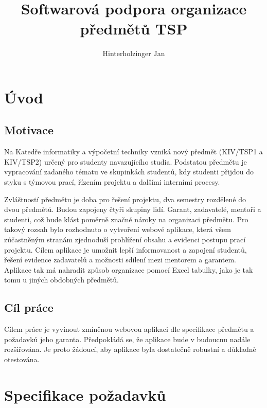 \documentclass[czech,BP]{thesiskiv}
\author{Hinterholzinger Jan}
\title{Softwarová podpora organizace předmětů TSP}
\begin{document}
%
\maketitle
\tableofcontents
\chapter{Úvod}
\section{Motivace}
	\par Na Katedře informatiky a výpočetní techniky vzniká nový předmět  (KIV/TSP1 a KIV/TSP2) určený pro studenty navazujícího studia. Podstatou předmětu je vypracování zadaného tématu ve skupinkách studentů, kdy studenti přijdou do styku s týmovou prací, řízením projektu a dalšími interními procesy.
	\par Zvláštností předmětu je doba pro řešení projektu, dva semestry rozdělené do dvou předmětů. Budou zapojeny čtyři skupiny lidí. Garant, zadavatelé, mentoři a studenti, což bude klást poměrně značné nároky na organizaci předmětu. Pro takový rozsah bylo rozhodnuto o vytvoření webové aplikace, která všem zúčastněným stranám zjednoduší prohlížení obsahu a evidenci postupu prací projektu. Cílem aplikace je umožnit lepší informovanost a zapojení studentů, řešení evidence zadavatelů a možnosti sdílení mezi mentorem a garantem. Aplikace tak má nahradit způsob organizace pomocí Excel tabulky, jako je tak tomu u jiných obdobných předmětů.
\section{Cíl práce}
	\par Cílem práce je vyvinout zmíněnou webovou aplikaci dle specifikace předmětu a požadavků jeho garanta. Předpokládá se, že aplikace bude v budoucnu nadále rozšiřována. Je proto žádoucí, aby aplikace byla dostatečně robustní a důkladně otestována.
\chapter{Specifikace požadavků}
\end{document}
